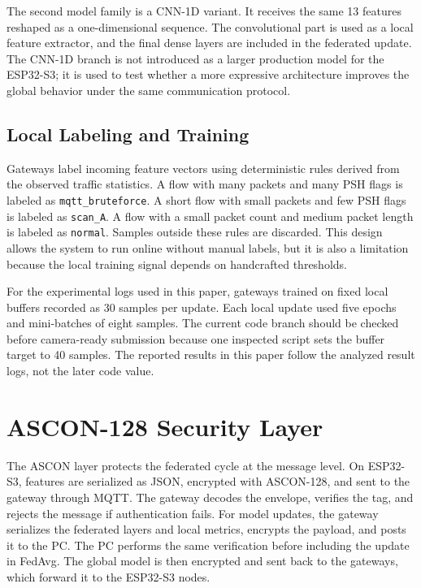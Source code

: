 \documentclass[runningheads]{llncs}
\begin{document}
The second model family is a CNN-1D variant. It receives the same 13 features reshaped as a one-dimensional sequence. The convolutional part is used as a local feature extractor, and the final dense layers are included in the federated update. The CNN-1D branch is not introduced as a larger production model for the ESP32-S3; it is used to test whether a more expressive architecture improves the global behavior under the same communication protocol.

\subsection{Local Labeling and Training}

Gateways label incoming feature vectors using deterministic rules derived from the observed traffic statistics. A flow with many packets and many PSH flags is labeled as \texttt{mqtt\_bruteforce}. A short flow with small packets and few PSH flags is labeled as \texttt{scan\_A}. A flow with a small packet count and medium packet length is labeled as \texttt{normal}. Samples outside these rules are discarded. This design allows the system to run online without manual labels, but it is also a limitation because the local training signal depends on handcrafted thresholds.

For the experimental logs used in this paper, gateways trained on fixed local buffers recorded as 30 samples per update. Each local update used five epochs and mini-batches of eight samples. The current code branch should be checked before camera-ready submission because one inspected script sets the buffer target to 40 samples. The reported results in this paper follow the analyzed result logs, not the later code value.

\section{ASCON-128 Security Layer}

The ASCON layer protects the federated cycle at the message level. On ESP32-S3, features are serialized as JSON, encrypted with ASCON-128, and sent to the gateway through MQTT. The gateway decodes the envelope, verifies the tag, and rejects the message if authentication fails. For model updates, the gateway serializes the federated layers and local metrics, encrypts the payload, and posts it to the PC. The PC performs the same verification before including the update in FedAvg. The global model is then encrypted and sent back to the gateways, which forward it to the ESP32-S3 nodes.
\end{document}
